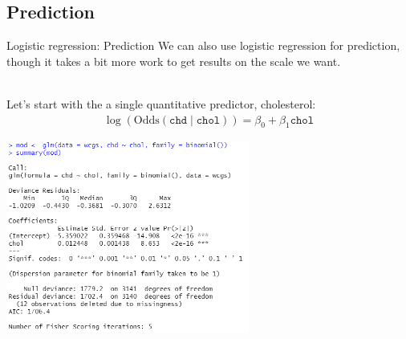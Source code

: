 \documentclass[10pt,t]{beamer}
\begin{document}
\subsection{Prediction}
\begin{frame}{Logistic regression: Prediction}
	We can also use logistic regression for prediction, though it takes a bit more work to get results on the scale we want. 
	\\ ~\
	
	Let's start with the a single quantitative predictor, cholesterol:
	\begin{align*}
		\log(\text{Odds}(\texttt{chd} \mid \texttt{chol})) = \beta_0 + \beta_1 \texttt{chol}
	\end{align*}
	\begin{center}
	\includegraphics[width=0.6\textwidth]{./figs/simple_logistic_regression_chol}
\end{center}
\end{frame}
\end{document}
